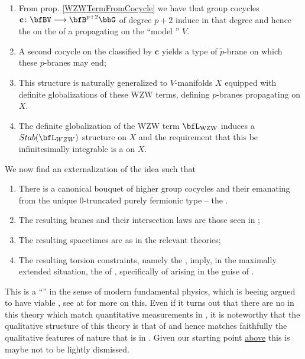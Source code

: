 \begin{enumerate}%
\item From prop. \ref{WZWTermFromCocycle} we have that group cocycles $\mathbf{c}\colon \bfBV \longrightarrow \bfB^{p+2}\bbG$ of degree $p+2$ induce  in that degree and hence the    on the  of a  propagating on the ``model '' $V$.
\item A second cocycle on the  classified by $\mathbf{c}$ yields a type of $\tilde p$-brane on which these $p$-branes may end;
\item This structure is naturally generalized to $V$-manifolds $X$ equipped with definite globalizations of these WZW terms, defining $p$-branes propagating on $X$.
\item The definite globalization of the WZW term $\bfL_{\mathrm{WZW}}$ induces a $Stab(\bfL_{WZW})$ structure on $X$ and the requirement that this be infinitesimally integrable is a  on $X$.
\end{enumerate}
We now find an externalization of the idea such that
\begin{enumerate}%
\item There is a canonical bouquet of higher group cocycles and their  emanating from the unique 0-truncated purely fermionic type -- the .
\item The resulting branes and their intersection laws are those seen in ;
\item The resulting spacetimes are  as in the relevant  theories;
\item The resulting torsion constraints, namely the , imply, in the maximally extended situation, the   of , specifically of  arising in the guise of .
\end{enumerate}
This is a ``'' in the sense of modern fundamental physics, which is beeing argued to have viable , see at  for more on this. Even if it turns out that there are no  in this theory which match quantitative measurements in , it is noteworthy that the qualitative structure of this theory is that of  and hence matches faithfully the qualitative features of nature that is in . Given our starting point \hyperlink{TheGround}{above} this is maybe not to be lightly dismissed.
